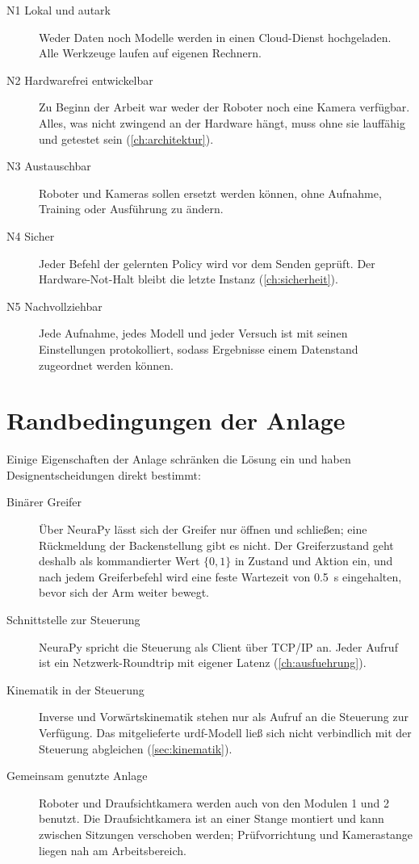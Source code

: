 \begin{description}
  \item[N1 Lokal und autark] Weder Daten noch Modelle werden in einen Cloud-Dienst
    hochgeladen. Alle Werkzeuge laufen auf eigenen Rechnern.
  \item[N2 Hardwarefrei entwickelbar] Zu Beginn der Arbeit war weder der Roboter noch eine
    Kamera verfügbar. Alles, was nicht zwingend an der Hardware hängt, muss ohne sie lauffähig
    und getestet sein (\cref{ch:architektur}).
  \item[N3 Austauschbar] Roboter und Kameras sollen ersetzt werden können, ohne Aufnahme,
    Training oder Ausführung zu ändern.
  \item[N4 Sicher] Jeder Befehl der gelernten Policy wird vor dem Senden geprüft. Der
    Hardware-Not-Halt bleibt die letzte Instanz (\cref{ch:sicherheit}).
  \item[N5 Nachvollziehbar] Jede Aufnahme, jedes Modell und jeder Versuch ist mit seinen
    Einstellungen protokolliert, sodass Ergebnisse einem Datenstand zugeordnet werden können.
\end{description}

\section{Randbedingungen der Anlage}
\label{sec:randbedingungen}

Einige Eigenschaften der Anlage schränken die Lösung ein und haben Designentscheidungen
direkt bestimmt:

\begin{description}
  \item[Binärer Greifer] Über NeuraPy lässt sich der Greifer nur öffnen und schließen; eine
    Rückmeldung der Backenstellung gibt es nicht. Der Greiferzustand geht deshalb als
    kommandierter Wert $\{0, 1\}$ in Zustand und Aktion ein, und nach jedem Greiferbefehl
    wird eine feste Wartezeit von \SI{0.5}{\second} eingehalten, bevor sich der Arm weiter
    bewegt.
  \item[Schnittstelle zur Steuerung] NeuraPy spricht die Steuerung als Client über
    TCP/IP an. Jeder Aufruf ist ein Netzwerk-Roundtrip mit eigener Latenz
    (\cref{ch:ausfuehrung}).
  \item[Kinematik in der Steuerung] Inverse und Vorwärtskinematik stehen nur als Aufruf an
    die Steuerung zur Verfügung. Das mitgelieferte \ac{urdf}-Modell ließ sich nicht
    verbindlich mit der Steuerung abgleichen (\cref{sec:kinematik}).
  \item[Gemeinsam genutzte Anlage] Roboter und Draufsichtkamera werden auch von den Modulen
    1 und 2 benutzt. Die Draufsichtkamera ist an einer Stange montiert und kann zwischen
    Sitzungen verschoben werden; Prüfvorrichtung und Kamerastange liegen nah am
    Arbeitsbereich.
\end{description}

